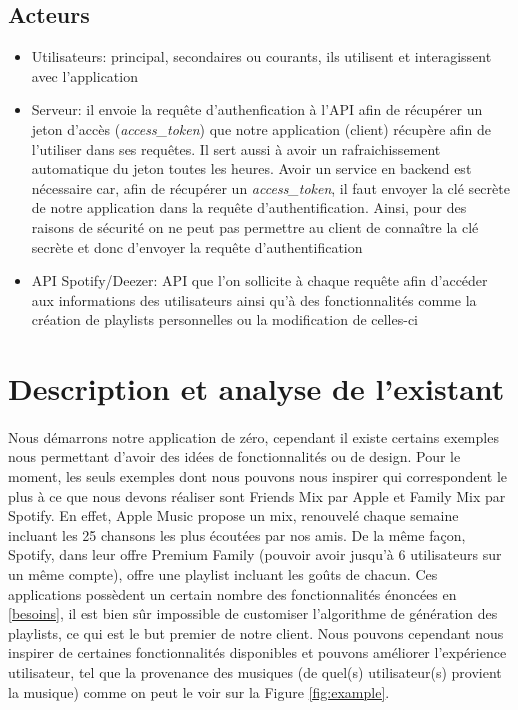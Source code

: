 \documentclass{article}
\begin{document}
		\subsection{Acteurs}
		\begin{itemize}
			\item Utilisateurs: principal, secondaires ou courants, ils utilisent et interagissent avec l'application
			\item Serveur: il envoie la requête d'authenfication à l'API afin de récupérer un jeton d'accès (\textit{access\_token}) que  notre application (client) récupère afin de l'utiliser dans ses requêtes. Il sert aussi à avoir un rafraichissement automatique du jeton toutes les heures. Avoir un service en backend est nécessaire car, afin de récupérer un \textit{access\_token}, il faut envoyer la clé secrète de notre application dans la requête d'authentification. Ainsi, pour des raisons de sécurité on ne peut pas permettre au client de connaître la clé secrète et donc d'envoyer la requête d'authentification
			\item API Spotify/Deezer: API que l'on sollicite à chaque requête afin d'accéder aux informations des utilisateurs ainsi qu'à des fonctionnalités comme la création de playlists personnelles ou la modification de celles-ci
		\end{itemize}

		\section{Description et analyse de l'existant}
		\paragraph{}
		Nous démarrons notre application de zéro, cependant il existe certains exemples nous permettant d'avoir des idées de fonctionnalités ou de design. Pour le moment, les seuls exemples dont nous pouvons nous inspirer qui correspondent le plus à ce que nous devons réaliser sont Friends Mix par Apple et Family Mix par Spotify. En effet, Apple Music propose un mix, renouvelé chaque semaine incluant les 25 chansons les plus écoutées par nos amis. De la même façon, Spotify, dans leur offre Premium Family (pouvoir avoir jusqu'à 6 utilisateurs sur un même compte), offre une playlist incluant les goûts de chacun. Ces applications possèdent un certain nombre des fonctionnalités énoncées en \ref{besoins}, il est bien sûr impossible de customiser l'algorithme de génération des playlists, ce qui est le but premier de notre client. Nous pouvons cependant nous inspirer de certaines fonctionnalités disponibles et pouvons améliorer l'expérience utilisateur, tel que la provenance des musiques (de quel(s) utilisateur(s) provient la musique) comme on peut le voir sur la Figure \ref{fig:example}.
								
\end{document}
